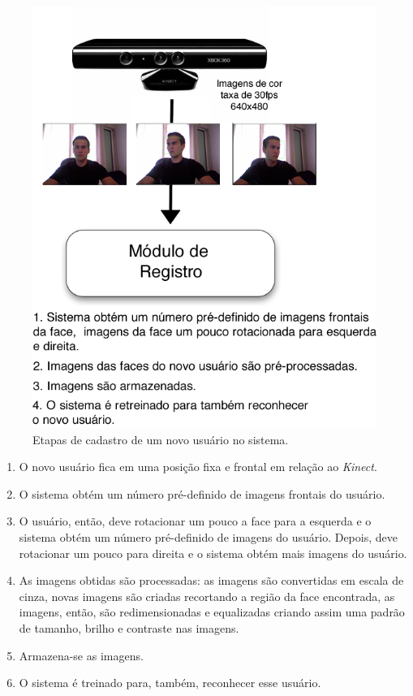 		\begin{figure}[hbt]
			\begin{center}
				\includegraphics[scale=2.5]{figuras/4.ProblemaEProposta/registro.png}
			\end{center}
			\caption{Etapas de cadastro de um novo usuário no sistema.}
			\label{fig:registro}
		\end{figure}		

		\begin{enumerate}
			\item O novo usuário fica em uma posição fixa e frontal em relação ao \textit{Kinect}. 
			\item O sistema obtém um número pré-definido de imagens frontais do usuário.
			\item O usuário, então, deve rotacionar um pouco a face para a esquerda e o sistema obtém um número pré-definido de imagens do usuário. Depois, deve rotacionar um pouco para direita e o sistema obtém mais imagens do usuário.
			\item As imagens obtidas são processadas: as imagens são convertidas em escala de cinza, novas imagens são criadas recortando a região da face encontrada, as imagens, então, são redimensionadas e equalizadas criando assim uma padrão de tamanho, brilho e contraste nas imagens.
			\item Armazena-se as imagens.
			\item O sistema é treinado para, também, reconhecer esse usuário.
		\end{enumerate}

